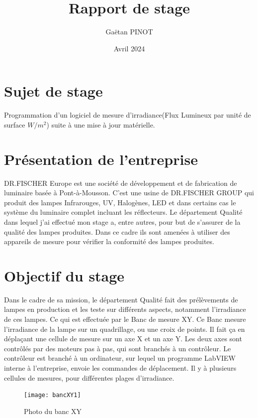 \documentclass[a4paper, 12pt]{article}
\title{\Large\textbf{Rapport de stage}}
\author{Gaëtan PINOT}
\date{Avril 2024}
\begin{document}
\maketitle

\newpage


\section{Sujet de stage}

Programmation d'un logiciel de mesure d'irradiance(Flux Lumineux par unité de surface $W/m^2$) suite à une mise à jour matérielle.  

\section{Présentation de l'entreprise}

DR.FISCHER Europe est une société de développement et de fabrication de luminaire basée à Pont-à-Mousson. C'est une usine de DR.FISCHER GROUP qui produit des lampes Infrarouges, UV, Halogènes, LED et dans certains cas le système du luminaire complet incluant les réflecteurs.  
Le département Qualité dans lequel j'ai effectué mon stage a, entre autres, pour but de s'assurer de la qualité des lampes produites.  
Dans ce cadre ils sont amenées à utiliser des appareils de mesure pour vérifier la conformité des lampes produites.  
  
\section{Objectif du stage}

  
Dans le cadre de sa mission, le département Qualité fait des prélèvements de lampes en production et les teste sur différents aspects, notamment l'irradiance de ces lampes.
Ce qui est effectuée par le Banc de mesure XY.  
Ce Banc mesure l'irradiance de la lampe sur un quadrillage, ou une croix de points.
Il fait ça en déplaçant une cellule de mesure sur un axe X et un axe Y.
Les deux axes sont contrôlés par des moteurs pas à pas, qui sont branchés à un contrôleur.
Le contrôleur est branché à un ordinateur, sur lequel un programme LabVIEW interne à l'entreprise, envoie les commandes de déplacement.  
Il y à plusieurs cellules de mesures, pour différentes plages d'irradiance.  
  
\begin{figure}[h]
	\centering
	\texttt{[image: bancXY1]}
	\caption{Photo du banc XY}
	\label{fig:bancXY1}
\end{figure}
\end{document}
